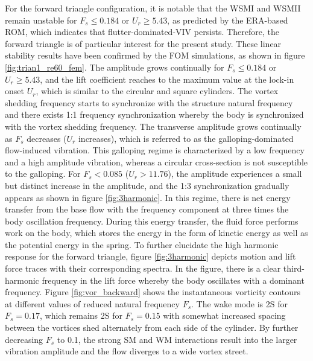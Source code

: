 \documentclass{jfm}
\begin{document}
For the forward triangle configuration, it is notable that the WSMI and WSMII remain unstable 
for $F_s \le 0.184$ or $U_r \ge 5.43$, as predicted by the ERA-based ROM, 
which indicates that flutter-dominated-VIV persists.
Therefore, the forward triangle is of particular interest for the present study.
%
These linear stability results have been confirmed by the FOM simulations, as shown 
in figure \ref{fig:trian1_re60_fem}. The amplitude grows continually for $F_s \le 0.184$ or $U_r \ge 5.43$, 
and the lift coefficient reaches to the maximum value at the lock-in onset $U_r$, which is similar to the circular 
and square cylinders. The vortex shedding frequency starts to synchronize with 
the structure natural frequency and there exists 1:1 frequency synchronization whereby 
the body is synchronized with the vortex shedding frequency. 
The transverse amplitude grows continually as $F_s$ decreases ($U_r$ increases), 
which is referred to as the galloping-dominated flow-induced vibration. 
This galloping regime is characterized by a low frequency and a high amplitude vibration, whereas a circular cross-section is not susceptible to the galloping.
%
For $F_s < 0.085$ ($U_r > 11.76$), the amplitude experiences a small but 
distinct increase in the amplitude, and the 1:3 synchronization gradually appears 
as shown in figure \ref{fig:3harmonic}.
In this regime, there is net energy transfer from the base flow with the frequency component at three times 
the body oscillation frequency. During this energy transfer, the fluid force performs 
work on the body, which stores the energy in the form of kinetic energy as well as the potential energy in the spring. 
%
To further elucidate the high harmonic response for the forward triangle, figure \ref{fig:3harmonic} 
depicts motion and lift force traces with their corresponding spectra. 
In the figure, there is a  clear third-harmonic frequency in the lift force whereby the body oscillates with a dominant frequency.
Figure \ref{fig:vor_backward} shows the instantaneous vorticity contours at different values 
of reduced natural frequency $F_s$.
The wake mode is 2S for $F_{s}=0.17$, which remains 2S for $F_{s}=0.15$ with somewhat 
increased spacing between the vortices shed alternately from each side of the cylinder.
By further decreasing $F_s$ to 0.1, the strong SM and WM interactions result into the 
larger vibration amplitude and the flow diverges to a wide vortex street.
\end{document}
